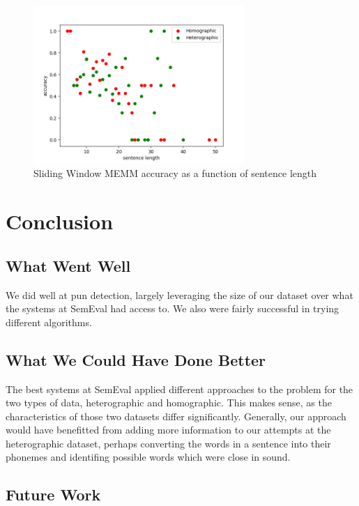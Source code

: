 \documentclass{article}
\begin{document}
\begin{figure}[h!]
    \centering
    \includegraphics[width=8cm]{figures/location-window.png}
	\caption{Sliding Window MEMM accuracy as a function of sentence length}
    \label{fig:method}
\end{figure}


\section{Conclusion}
\label{conclusion}

\subsection{What Went Well}

We did well at pun detection, largely leveraging the size of our dataset over
what the systems at SemEval had access to. We also were fairly successful in
trying different algorithms. 

\subsection{What We Could Have Done Better}

The best systems at SemEval applied different approaches to the problem for the
two types of data, heterographic and homographic. This makes sense, as the
characteristics of those two datasets differ significantly. Generally, our
approach would have benefitted from adding more information to our attempts at
the heterographic dataset, perhaps converting the words in a sentence into their
phonemes and identifing possible words which were close in sound.

\subsection{Future Work}
\end{document}
